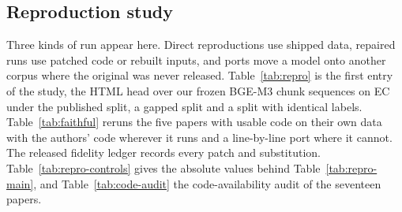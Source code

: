 \subsection{Reproduction study}
\label{app:repro}
Three kinds of run appear here. Direct reproductions use shipped data, repaired
runs use patched code or rebuilt inputs, and ports move a model onto another
corpus where the original was never released. Table~\ref{tab:repro} is the first entry of the study, the HTML head over our
frozen BGE-M3 chunk sequences on EC under the published split, a gapped split and
a \tickerdisjoint{} split with identical labels. Table~\ref{tab:faithful} reruns
the five papers with usable code on their own data with the authors' code wherever
it runs and a line-by-line port where it cannot. The released fidelity ledger
records every patch and substitution. Table~\ref{tab:repro-controls} gives the
absolute values behind Table~\ref{tab:repro-main}, and Table~\ref{tab:code-audit}
the code-availability audit of the seventeen papers.

